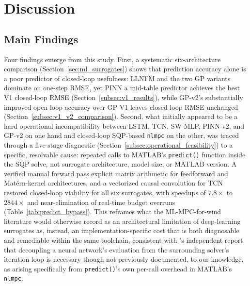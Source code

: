
\section{Discussion}
\label{sec:discussion}

\subsection{Main Findings}
\label{subsec:main_findings}

Four findings emerge from this study. First, a systematic six-architecture
comparison (Section~\ref{sec:ml_surrogates}) shows that prediction accuracy
alone is a poor predictor of closed-loop usefulness: LLNFM and the two GP
variants dominate on one-step RMSE, yet PINN a mid-table predictor
achieves the best V1 closed-loop RMSE (Section~\ref{subsec:v1_results}),
while GP-v2's substantially improved open-loop accuracy over GP V1 leaves
closed-loop RMSE unchanged (Section~\ref{subsec:v1_v2_comparison}). Second,
what initially appeared to be a hard operational incompatibility between
LSTM, TCN, SW-MLP, PINN-v2, and GP-v2 on one hand and closed-loop
SQP-based \texttt{nlmpc} on the other, was traced through a five-stage
diagnostic (Section~\ref{subsec:operational_feasibility}) to a specific,
resolvable cause: repeated calls to MATLAB's \texttt{predict()} function
inside the SQP solve, not surrogate architecture, model size, or MATLAB
version. A verified manual forward pass  explicit matrix arithmetic
for feedforward and Mat\'ern-kernel architectures, and a vectorized
causal convolution for TCN  restored closed-loop viability for all
six surrogates, with speedups of $7.8\times$ to $2844\times$ and
near-elimination of real-time budget overruns
(Table~\ref{tab:predict_bypass}). This reframes what the ML-MPC-for-wind
literature would otherwise record as an architectural limitation of
deep-learning surrogates as, instead, an implementation-specific cost
that is both diagnosable and remediable within the same toolchain,
consistent with \citet{salzmann_real-time_2022}'s independent report
that decoupling a neural network's evaluation from the surrounding
solver's iteration loop is necessary  though not previously
documented, to our knowledge, as arising specifically from
\texttt{predict()}'s own per-call overhead in MATLAB's \texttt{nlmpc}.
